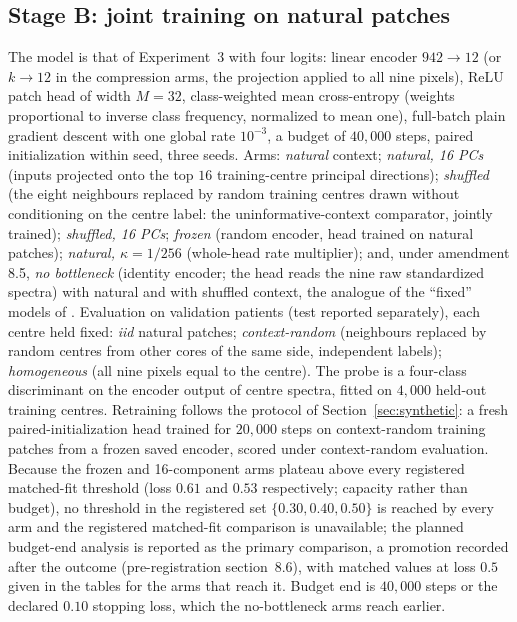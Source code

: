 \subsection{Stage B: joint training on natural patches}
The model is that of Experiment~3 with four logits: linear encoder $942\to12$ (or
$k\to12$ in the compression arms, the projection applied to all nine pixels), ReLU
patch head of width $M=32$, class-weighted mean cross-entropy (weights proportional to
inverse class frequency, normalized to mean one), full-batch plain gradient descent
with one global rate $10^{-3}$, a budget of $40{,}000$ steps, paired initialization
within seed, three seeds. Arms: \emph{natural} context; \emph{natural, 16 PCs}
(inputs projected onto the top $16$ training-centre principal directions);
\emph{shuffled} (the eight neighbours replaced by random training centres drawn
without conditioning on the centre label: the uninformative-context comparator,
jointly trained); \emph{shuffled, 16 PCs}; \emph{frozen} (random encoder, head trained on
natural patches); \emph{natural, $\kappa=1/256$} (whole-head rate multiplier); and,
under amendment 8.5, \emph{no bottleneck} (identity encoder; the head reads the nine
raw standardized spectra) with natural and with shuffled context, the analogue of the
``fixed'' models of \citet{oleary2026spatial}. Evaluation on validation patients (test
reported separately), each centre held fixed: \emph{iid} natural patches;
\emph{context-random} (neighbours replaced by random centres from other cores of the
same side, independent labels); \emph{homogeneous} (all nine pixels equal to the
centre). The probe is a four-class discriminant on the encoder output of centre
spectra, fitted on $4{,}000$ held-out training centres. Retraining follows the
protocol of Section~\ref{sec:synthetic}: a fresh paired-initialization head trained
for $20{,}000$ steps on context-random training patches from a frozen saved encoder,
scored under context-random evaluation. Because the frozen and 16-component arms
plateau above every registered matched-fit threshold (loss $0.61$ and $0.53$
respectively; capacity rather than budget), no threshold in the registered set
$\{0.30,0.40,0.50\}$ is reached by every arm and the registered matched-fit comparison
is unavailable; the planned budget-end analysis is reported as the primary comparison,
a promotion recorded after the outcome (pre-registration section~8.6), with matched
values at loss $0.5$ given in the tables for the arms that reach it. Budget end is
$40{,}000$ steps or the declared $0.10$ stopping loss, which the no-bottleneck arms
reach earlier.

